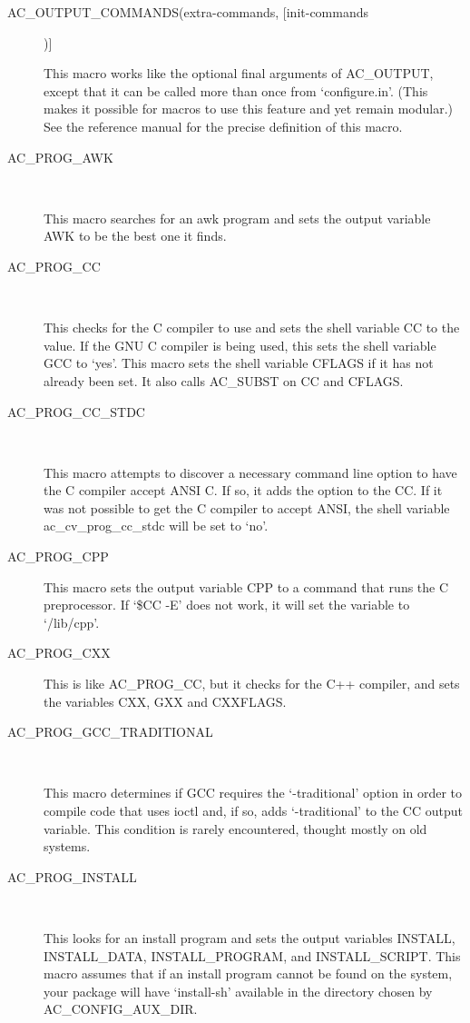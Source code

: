 \begin{description}
\item[AC\_{}OUTPUT\_{}COMMANDS(extra-commands, [init-commands])]
\

    This macro works like the optional final arguments of AC\_{}OUTPUT, except that it can be called more than once from `configure.in'. (This makes it possible for macros to use this feature and yet remain modular.) See the reference manual for the precise definition of this macro.

\item[AC\_{}PROG\_{}AWK]
\

    This macro searches for an awk program and sets the output variable AWK to be the best one it finds.

\item[AC\_{}PROG\_{}CC]
\

    This checks for the C compiler to use and sets the shell variable CC to the value. If the GNU C compiler is being used, this sets the shell variable GCC to `yes'. This macro sets the shell variable CFLAGS if it has not already been set. It also calls AC\_{}SUBST on CC and CFLAGS.

\item[AC\_{}PROG\_{}CC\_{}STDC]
\

This macro attempts to discover a necessary command line option to have 
the C compiler accept ANSI C. If so, it adds the option to the CC. If 
it was not possible to get the C compiler to accept ANSI, the shell 
variable ac\_{}cv\_{}prog\_{}cc\_{}stdc will be set to `no'.

\item[AC\_{}PROG\_{}CPP]
    This macro sets the output variable CPP to a command that runs the C preprocessor. If `\$CC -E' does not work, it will set the variable to `/lib/cpp'.

\item[AC\_{}PROG\_{}CXX]
    This is like AC\_{}PROG\_{}CC, but it checks for the C++ compiler, and sets the variables CXX, GXX and CXXFLAGS.

\item[AC\_{}PROG\_{}GCC\_{}TRADITIONAL]
\

    This macro determines if GCC requires the `-traditional' option in order to compile code that uses ioctl and, if so, adds `-traditional' to the CC output variable. This condition is rarely encountered, thought mostly on old systems.

\item[AC\_{}PROG\_{}INSTALL]
\

    This looks for an install program and sets the output variables INSTALL, INSTALL\_{}DATA, INSTALL\_{}PROGRAM, and INSTALL\_{}SCRIPT. This macro assumes that if an install program cannot be found on the system, your package will have `install-sh' available in the directory chosen by AC\_{}CONFIG\_{}AUX\_{}DIR.


\end{description}
